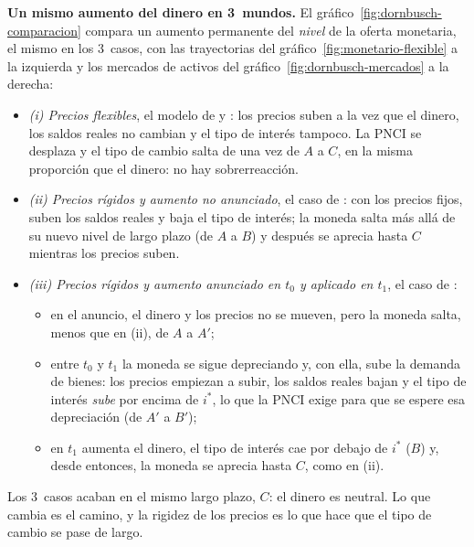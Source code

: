 \documentclass[11pt]{article}
\begin{document}
\begin{anotaciones}[unbreakable]
\textbf{Un mismo aumento del dinero en 3~mundos.} El gráfico~\ref{fig:dornbusch-comparacion} compara un aumento permanente del \emph{nivel} de la oferta monetaria, el mismo en los 3~casos, con las trayectorias del gráfico~\ref{fig:monetario-flexible} a la izquierda y los mercados de activos del gráfico~\ref{fig:dornbusch-mercados} a la derecha:
\begin{itemize}
\item \emph{(i) Precios flexibles}, el modelo de  y \nocite{Frenkel1976Monetary,Mussa1976Exchange}: los precios suben a la vez que el dinero, los saldos reales no cambian y el tipo de interés tampoco. La PNCI se desplaza y el tipo de cambio salta de una vez de $A$ a $C$, en la misma proporción que el dinero: no hay sobrerreacción.
\item \emph{(ii) Precios rígidos y aumento no anunciado}, el caso de : con los precios fijos, suben los saldos reales y baja el tipo de interés; la moneda salta más allá de su nuevo nivel de largo plazo (de $A$ a $B$) y después se aprecia hasta $C$ mientras los precios suben.
\item \emph{(iii) Precios rígidos y aumento anunciado en $t_0$ y aplicado en $t_1$}, el caso de \nocite{Wilson1979Anticipated}:
  \begin{itemize}
  \item en el anuncio, el dinero y los precios no se mueven, pero la moneda salta, menos que en (ii), de $A$ a $A'$;
  \item entre $t_0$ y $t_1$ la moneda se sigue depreciando y, con ella, sube la demanda de bienes: los precios empiezan a subir, los saldos reales bajan y el tipo de interés \emph{sube} por encima de $i^*$, lo que la PNCI exige para que se espere esa depreciación (de $A'$ a $B'$);
  \item en $t_1$ aumenta el dinero, el tipo de interés cae por debajo de $i^*$ ($B$) y, desde entonces, la moneda se aprecia hasta $C$, como en (ii).
  \end{itemize}
\end{itemize}
Los 3~casos acaban en el mismo largo plazo, $C$: el dinero es neutral. Lo que cambia es el camino, y la rigidez de los precios es lo que hace que el tipo de cambio se pase de largo.
\begin{figuracaja}
\caption{Un aumento permanente de la oferta monetaria con precios flexibles, con precios rígidos sin anunciar y con precios rígidos anunciado}\label{fig:dornbusch-comparacion}
\end{figuracaja}
\end{anotaciones}
\end{document}
